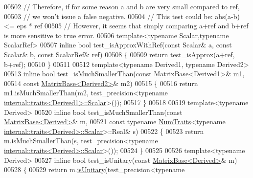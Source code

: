 \begin{DoxyCode}
00502 \textcolor{comment}{// Therefore, if for some reason a and b are very small compared to ref,}
00503 \textcolor{comment}{// we won't issue a false negative.}
00504 \textcolor{comment}{// This test could be: abs(a-b) <= eps * ref}
00505 \textcolor{comment}{// However, it seems that simply comparing a+ref and b+ref is more sensitive to true error.}
00506 \textcolor{keyword}{template}<\textcolor{keyword}{typename} Scalar,\textcolor{keyword}{typename} ScalarRef>
00507 \textcolor{keyword}{inline} \textcolor{keywordtype}{bool} test\_isApproxWithRef(\textcolor{keyword}{const} Scalar& a, \textcolor{keyword}{const} Scalar& b, \textcolor{keyword}{const} ScalarRef& ref)
00508 \{
00509   \textcolor{keywordflow}{return} test\_isApprox(a+ref, b+ref);
00510 \}
00511 
00512 \textcolor{keyword}{template}<\textcolor{keyword}{typename} Derived1, \textcolor{keyword}{typename} Derived2>
00513 \textcolor{keyword}{inline} \textcolor{keywordtype}{bool} test\_isMuchSmallerThan(\textcolor{keyword}{const} \hyperlink{group___core___module_class_eigen_1_1_matrix_base}{MatrixBase<Derived1>}& m1,
00514                                    \textcolor{keyword}{const} \hyperlink{group___core___module_class_eigen_1_1_matrix_base}{MatrixBase<Derived2>}& m2)
00515 \{
00516   \textcolor{keywordflow}{return} m1.isMuchSmallerThan(m2, test\_precision<\textcolor{keyword}{typename} 
      \hyperlink{struct_eigen_1_1internal_1_1traits}{internal::traits<Derived1>::Scalar}>());
00517 \}
00518 
00519 \textcolor{keyword}{template}<\textcolor{keyword}{typename} Derived>
00520 \textcolor{keyword}{inline} \textcolor{keywordtype}{bool} test\_isMuchSmallerThan(\textcolor{keyword}{const} \hyperlink{group___core___module_class_eigen_1_1_matrix_base}{MatrixBase<Derived>}& m,
00521                                    \textcolor{keyword}{const} \textcolor{keyword}{typename} \hyperlink{group___core___module_struct_eigen_1_1_num_traits}{NumTraits}<\textcolor{keyword}{typename} 
      \hyperlink{struct_eigen_1_1internal_1_1traits}{internal::traits<Derived>::Scalar}>::Real& s)
00522 \{
00523   \textcolor{keywordflow}{return} m.isMuchSmallerThan(s, test\_precision<\textcolor{keyword}{typename} 
      \hyperlink{struct_eigen_1_1internal_1_1traits}{internal::traits<Derived>::Scalar}>());
00524 \}
00525 
00526 \textcolor{keyword}{template}<\textcolor{keyword}{typename} Derived>
00527 \textcolor{keyword}{inline} \textcolor{keywordtype}{bool} test\_isUnitary(\textcolor{keyword}{const} \hyperlink{group___core___module_class_eigen_1_1_matrix_base}{MatrixBase<Derived>}& m)
00528 \{
00529   \textcolor{keywordflow}{return} m.\hyperlink{group___core___module_a8a7ee34ce202cac3eeea9cf20c9e4833}{isUnitary}(test\_precision<\textcolor{keyword}{typename} 

\end{DoxyCode}
